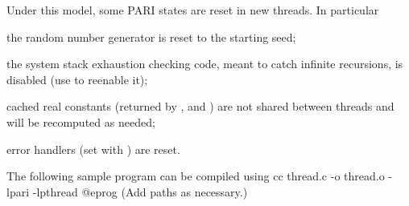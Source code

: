 \noindent Under this model, some PARI states are reset in new threads. In
particular

\item the random number generator is reset to the starting seed;

\item the system stack exhaustion checking code, meant to catch infinite
recursions, is disabled (use  to reenable it);

\item cached real constants (returned by ,  and
) are not shared between threads and will be recomputed as
needed;

\item error handlers (set with ) are reset.

\noindent The following sample program can be compiled using
\bprog
    cc thread.c -o thread.o -lpari -lpthread
@eprog\noindent
(Add  paths as necessary.)

\noindent{}

\vfill\eject
